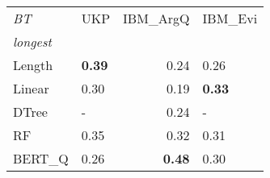 \begin{tabular}{llrl}
\toprule
\textit{BT} &   UKP &  IBM\_ArgQ & IBM\_Evi \\
\textit{longest}  &       &           &         \\
\midrule
Length &  \textbf{0.39} &      0.24 &    0.26 \\
Linear &   0.30 &      0.19 &    \textbf{0.33} \\
DTree  &     - &      0.24 &       - \\
RF     &  0.35 &      0.32 &    0.31 \\
BERT\_Q &  0.26 &      \textbf{0.48} &     0.30 \\
\bottomrule
\end{tabular}
